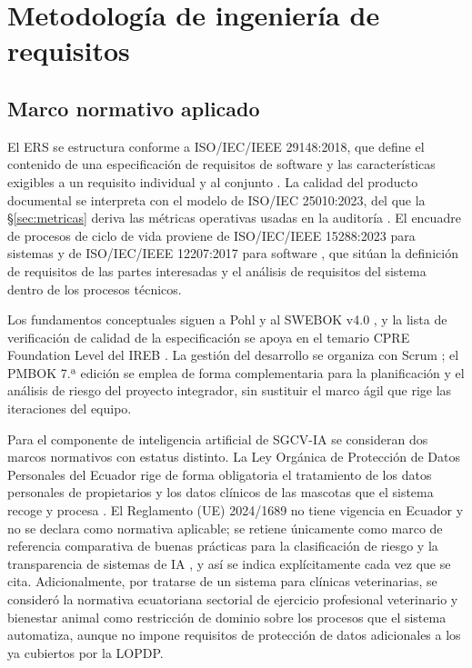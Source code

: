 \section{Metodología de ingeniería de requisitos}
\label{sec:metodologia}
 
\subsection{Marco normativo aplicado}
 
El ERS se estructura conforme a ISO/IEC/IEEE 29148:2018, que define el contenido de una
especificación de requisitos de software y las características exigibles a un requisito individual y
al conjunto \cite{iso29148}. La calidad del producto documental se interpreta con el modelo de
ISO/IEC 25010:2023, del que la \S\ref{sec:metricas} deriva las métricas operativas usadas en la
auditoría \cite{iso25010}. El encuadre de procesos de ciclo de vida proviene de ISO/IEC/IEEE
15288:2023 para sistemas y de ISO/IEC/IEEE 12207:2017 para software \cite{iso15288, iso12207}, que
sitúan la definición de requisitos de las partes interesadas y el análisis de requisitos del sistema
dentro de los procesos técnicos.
 
Los fundamentos conceptuales siguen a Pohl \cite{pohl2025} y al SWEBOK v4.0 \cite{swebok4}, y la
lista de verificación de calidad de la especificación se apoya en el temario CPRE Foundation Level
del IREB \cite{ireb31}. La gestión del desarrollo se organiza con Scrum \cite{cohn2004}; el PMBOK
7.ª edición \cite{pmbok7} se emplea de forma complementaria para la planificación y el análisis de
riesgo del proyecto integrador, sin sustituir el marco ágil que rige las iteraciones del equipo.
 
Para el componente de inteligencia artificial de SGCV-IA se consideran dos marcos normativos con
estatus distinto. La Ley Orgánica de Protección de Datos Personales del Ecuador rige de forma
obligatoria el tratamiento de los datos personales de propietarios y los datos clínicos de las
mascotas que el sistema recoge y procesa \cite{lopdp2021}. El Reglamento (UE) 2024/1689 no tiene
vigencia en Ecuador y no se declara como normativa aplicable; se retiene únicamente como marco de
referencia comparativa de buenas prácticas para la clasificación de riesgo y la transparencia de
sistemas de IA \cite{aiact2024}, y así se indica explícitamente cada vez que se cita. Adicionalmente,
por tratarse de un sistema para clínicas veterinarias, se consideró la normativa ecuatoriana
sectorial de ejercicio profesional veterinario y bienestar animal como restricción de dominio sobre
los procesos que el sistema automatiza, aunque no impone requisitos de protección de datos
adicionales a los ya cubiertos por la LOPDP.
 
